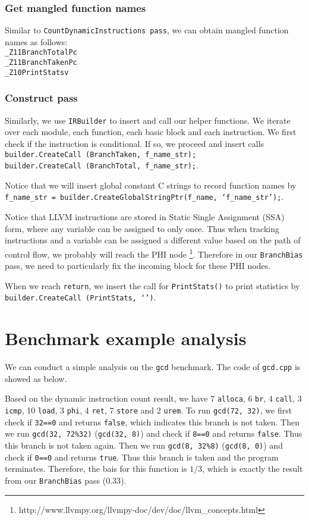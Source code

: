 \documentclass{acm_proc_article-sp}
\begin{document}
\subsubsection{Get mangled function names}
Similar to {\tt  CountDynamicInstructions pass}, we can obtain mangled function names as follows:\\
{\tt \small \_Z11BranchTotalPc}\\
{\tt \small\_Z11BranchTakenPc}\\
{\tt \small\_Z10PrintStatsv}

\subsubsection{Construct pass}
Similarly, we use {\tt IRBuilder} to insert and call our helper functions. We iterate over each module, each function, each basic block and each instruction. We first check if the instruction is conditional. If so, we proceed and insert calls \\
{\tt \small builder.CreateCall (BranchTaken, f\_name\_str);}\\
{\tt \small builder.CreateCall (BranchTotal, f\_name\_str);}.

Notice that we will insert global constant C strings to record function names by\\
{\tt \small f\_name\_str = builder.CreateGlobalStringPtr(f\_name, `f\_name\_str');}.

Notice that LLVM instructions are stored in Static Single Assignment (SSA) form, where any variable can be assigned to only once. Thus when tracking instructions and a variable can be assigned a different value based on the path of control flow, we probably will reach the PHI node \footnote{\small http://www.llvmpy.org/llvmpy-doc/dev/doc/llvm\_concepts.html}. Therefore in our {\tt BranchBias} pass, we need to particularly fix the incoming block for these PHI nodes.
\vspace{-0.02in}

When we reach {\tt return}, we insert the call for {\tt PrintStats()} to print statistics by\\
{\tt \small builder.CreateCall (PrintStats, `')}.

\section{Benchmark example analysis}
We can conduct a simple analysis on the {\tt gcd} benchmark. The code of {\tt gcd.cpp} is showed as below.

Based on the dynamic instruction count result, we have 7 {\tt alloca}, 6 {\tt br}, 4 {\tt call}, 3 {\tt icmp}, 10 {\tt load}, 3 {\tt phi}, 4 {\tt ret}, 7 {\tt store} and 2 {\tt urem}. To run {\tt gcd(72, 32)}, we first check if {\tt 32==0} and returns {\tt false}, which indicates this branch is not taken. Then we run {\tt gcd(32, 72\%32)} ({\tt gcd(32, 8)}) and check if {\tt 8==0} and returns {\tt false}. Thus this branch is not taken again. Then we run {\tt gcd(8, 32\%8)} ({\tt gcd(8, 0)}) and check if {\tt 0==0} and returns {\tt true}. Thus this branch is taken and the program terminates. Therefore, the bais for this function is $1/3$, which is exactly the result from our {\tt BranchBias} pass ($0.33$).
\end{document}
